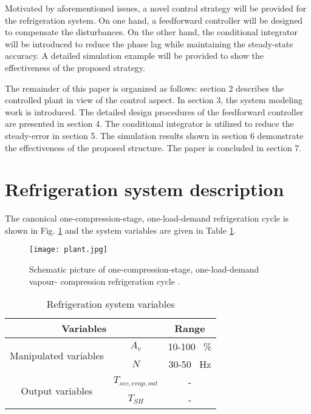 \documentclass{ifacconf}
\begin{document}
Motivated by aforementioned issues, a novel control strategy will be provided for the refrigeration system. On one hand, a feedforward controller will be designed to compensate the disturbances. On the other hand, the conditional integrator will be introduced to reduce the phase lag while maintaining the steady-state accuracy. A detailed simulation example will be provided to show the effectiveness of the proposed strategy.

The remainder of this paper is organized as follows: section 2 describes the controlled plant in view of the control aspect. In section 3, the system modeling work is introduced. The detailed design procedures of the feedforward controller are presented in section 4. The conditional integrator is utilized to reduce the steady-error in section 5. The simulation results shown in section 6 demonstrate the effectiveness of the proposed structure. The paper is concluded in section 7.

\section{Refrigeration system description}
The canonical one-compression-stage, one-load-demand refrigeration cycle is shown in Fig. \ref{plant} and the system variables are given in Table \ref{variables}.
\begin{figure}[htbp]
\begin{center}
\texttt{[image: plant.jpg]}    %
\caption{Schematic picture of one-compression-stage, one-load-demand vapour- compression refrigeration cycle \citep{Bejarano2018}.}
\label{plant}
\end{center}
\end{figure}

\begin{table}[htbp]
\centering
\caption{Refrigeration system variables}
\label{variables}
\begin{tabular}{|c|c|c|}
\hline
\multicolumn{2}{|c|}{Variables} & { Range} \\ \hline
\multirow{2}{*}{Manipulated variables}  & $A_v$  & 10-100 \ \% \\ \cline{2-3}
                   & $N$  & 30-50 \ \rm{Hz} \\ \hline
\multirow{2}{*}{Output variables}  &  $T_{sec,evap,out}$ &  - \\ \cline{2-3}
                   & $T_{SH}$  & - \\ \hline
\end{tabular}
\end{table}
\end{document}
